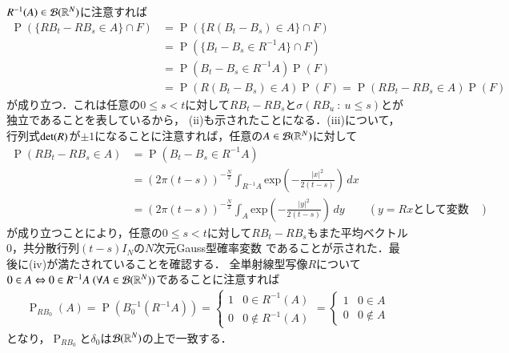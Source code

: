 \begin{prf}
\begin{description}
		$R^{-1}(A) \in \mathcal{B}(\mathbb{R}^N)$に注意すれば
		\begin{align}
			\operatorname{P}\left(\{RB_t - RB_s \in A\} \cap F \right) 
			&= \operatorname{P}\left(\{R(B_t - B_s) \in A\} \cap F \right) \\
			&= \operatorname{P}\left(\{B_t - B_s \in R^{-1}A\} \cap F \right) \\
			&= \operatorname{P}\left(B_t - B_s \in R^{-1}A\right)\operatorname{P}(F) \\
			&= \operatorname{P}\left(R(B_t - B_s) \in A\right)\operatorname{P}(F)
			= \operatorname{P}\left(RB_t - RB_s \in A\right)\operatorname{P}(F)
		\end{align}
		が成り立つ．これは任意の$0 \leq s < t$に対して$RB_t - RB_s$と$\sigma(RB_u\ :\ u \leq s)$とが独立であることを表しているから，
		(ii)も示されたことになる．(iii)について，行列式$\operatorname{det} ( R )$が$\pm 1$になることに注意すれば，任意の$A \in \mathcal{B}(\mathbb{R}^N)$に対して
		\begin{align}
			\operatorname{P}(RB_t - RB_s \in A) &= \operatorname{P}\left(B_t - B_s \in R^{-1}A\right) \\
			&= (2\pi(t-s))^{-\frac{N}{2}} \int_{R^{-1}A} \mathrm{exp}\left( -\frac{|x|^2}{2(t-s)} \right)\, dx \\
			&= (2\pi(t-s))^{-\frac{N}{2}} \int_{A} \mathrm{exp}\left( -\frac{|y|^2}{2(t-s)} \right)\, dy & \left(y = Rx\mbox{として変数変換}\right)
		\end{align}
		が成り立つことにより，任意の$0 \leq s < t$に対して$RB_t - RB_s$もまた平均ベクトル0，共分散行列$(t-s)I_N$の$N$次元Gauss型確率変数
		であることが示された．最後に(iv)が満たされていることを確認する．
		全単射線型写像$R$について$0 \in A \Leftrightarrow 0 \in R^{-1}A\ (\forall A \in \mathcal{B}(\mathbb{R}^N))$であることに注意すれば
		\begin{align}
			\operatorname{P}_{RB_0}(A) 
			= \operatorname{P}\left(B_0^{-1}\left(R^{-1}A\right)\right) 
			= \begin{cases}
				1 & 0 \in R^{-1}(A) \\
				0 & 0 \notin R^{-1}(A)
			\end{cases}
			= \begin{cases}
				1 & 0 \in A \\
				0 & 0 \notin A
			\end{cases}
		\end{align}
		となり，$\operatorname{P}_{RB_0}$と$\delta_0$は$\mathcal{B}(\mathbb{R}^N)$の上で一致する．
	

\end{description}
\end{prf}
